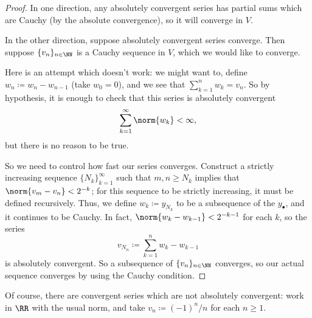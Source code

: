 \documentclass[../notes.tex]{subfiles}
\begin{document}
\begin{proof}
	In one direction, any absolutely convergent series has partial sums which are Cauchy (by the absolute convergence), so it will converge in $V$.

	In the other direction, suppose absolutely convergent series converge. Then suppose $\{v_n\}_{n\in\NN}$ is a Cauchy sequence in $V$, which we would like to converge.
	\begin{remark}
		Here is an attempt which doesn't work: we might want to, define $w_n\coloneqq w_n-w_{n-1}$ (take $w_0=0$), and we see that $\sum_{k=1}^nw_k=v_n$. So by hypothesis, it is enough to check that this series is absolutely convergent
		\[\sum_{k=1}^\infty\norm{w_k}<\infty,\]
		but there is no reason to be true.
	\end{remark}
	So we need to control how fast our series converges. Construct a strictly increasing sequence $\{N_k\}_{k=1}^\infty$ such that $m,n\ge N_k$ implies that $\norm{v_m-v_n}<2^{-k}$; for this sequence to be strictly increasing, it must be defined recursively. Thus, we define $w_k\coloneqq y_{N_k}$ to be a subsequence of the $y_\bullet$, and it continues to be Cauchy. In fact, $\norm{w_k-w_{k-1}}<2^{-k-1}$ for each $k$, so the series
	\[v_{N_n}\coloneqq\sum_{k=1}^nw_k-w_{k-1}\]
	is absolutely convergent. So a subsequence of $\{v_n\}_{n\in\NN}$ converges, so our actual sequence converges by using the Cauchy condition.
\end{proof}
\begin{remark}
	Of course, there are convergent series which are not absolutely convergent: work in $\RR$ with the usual norm, and take $v_n\coloneqq(-1)^n/n$ for each $n\ge1$.
\end{remark}
\end{document}
